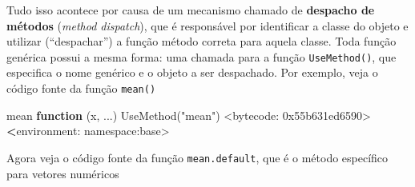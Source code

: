 \documentclass[
  10pt,
  a4paper]{book}
\newenvironment{Shaded}{\begin{snugshade}}{\end{snugshade}}
\newcommand{\ControlFlowTok}[1]{\textcolor[rgb]{0.13,0.29,0.53}{\textbf{#1}}}
\newcommand{\DecValTok}[1]{\textcolor[rgb]{0.00,0.00,0.81}{#1}}
\newcommand{\ErrorTok}[1]{\textcolor[rgb]{0.64,0.00,0.00}{\textbf{#1}}}
\newcommand{\FunctionTok}[1]{\textcolor[rgb]{0.00,0.00,0.00}{#1}}
\newcommand{\NormalTok}[1]{#1}
\newcommand{\SpecialCharTok}[1]{\textcolor[rgb]{0.00,0.00,0.00}{#1}}
\newcommand{\StringTok}[1]{\textcolor[rgb]{0.31,0.60,0.02}{#1}}
\begin{document}
Tudo isso acontece por causa de um mecanismo chamado de \textbf{despacho de
métodos} (\emph{method dispatch}), que é responsável por identificar a
classe do objeto e utilizar (``despachar'') a função método correta para
aquela classe. Toda função genérica possui a mesma forma: uma chamada
para a função \texttt{UseMethod()}, que especifica o nome genérico e o objeto a
ser despachado. Por exemplo, veja o código fonte da função \texttt{mean()}

\begin{Shaded}
\begin{Highlighting}[]
\NormalTok{mean}
\ControlFlowTok{function}\NormalTok{ (x, ...) }
\FunctionTok{UseMethod}\NormalTok{(}\StringTok{"mean"}\NormalTok{)}
\SpecialCharTok{\textless{}}\NormalTok{bytecode}\SpecialCharTok{:} \DecValTok{0x55b631ed6590}\SpecialCharTok{\textgreater{}}
\ErrorTok{\textless{}}\NormalTok{environment}\SpecialCharTok{:}\NormalTok{ namespace}\SpecialCharTok{:}\NormalTok{base}\SpecialCharTok{\textgreater{}}
\end{Highlighting}
\end{Shaded}

Agora veja o código fonte da função \texttt{mean.default}, que é o método
específico para vetores numéricos
\end{document}
